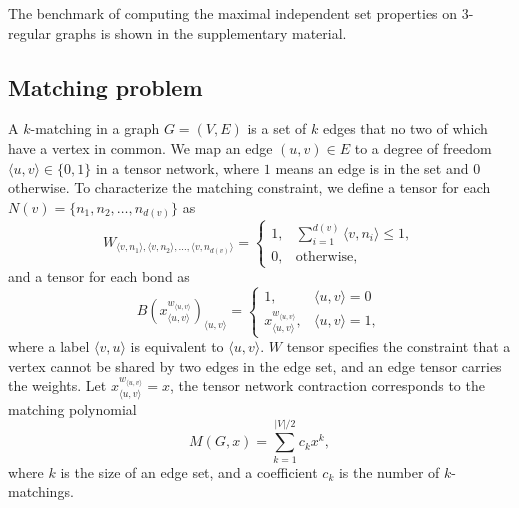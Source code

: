 \documentclass[onefignum, onetabnum]{siamart190516}
\newcommand{\<}{\langle}
\renewcommand{\>}{\rangle}
\begin{document}
The benchmark of computing the maximal independent set properties on $3$-regular graphs is shown in the supplementary material.

\subsection{Matching problem}
A $k$-matching in a graph $G=(V,E)$ is a set of $k$ edges that no two of which have a vertex in common.
We map an edge $(u, v) \in E$ to a degree of freedom $\langle u, v\rangle \in \{0, 1\}$ in a tensor network, where $1$ means an edge is in the set and $0$ otherwise.
To characterize the matching constraint, we define a tensor for each $N(v)=\{n_1, n_2,\ldots, n_{d(v)}\}$ as
\begin{equation}
    W_{\langle v, n_1\rangle, \langle v, n_2 \rangle, \ldots, \langle v, n_{d(v)}\rangle} = \begin{cases}
        1, & \sum_{i=1}^{d(v)} \langle v, n_i \rangle \leq 1,\\
        0, & \text{otherwise},
    \end{cases}
\end{equation}
and a tensor for each bond as
\begin{equation}
    B(x^{w_{\langle u,v \rangle}}_{\langle u,v\rangle})_{\langle u, v\rangle} = \begin{cases}
    1, & \langle u, v \rangle = 0 \\
    x^{w_{\langle u,v \rangle}}_{\langle u, v\rangle}, & \langle u, v \rangle = 1,
\end{cases}
\end{equation}
where a label $\langle v, u \rangle$ is equivalent to $\langle u,v\rangle$.
$W$ tensor specifies the constraint that a vertex cannot be shared by two edges in the edge set,
and an edge tensor carries the weights.
Let $x_{\langle u,v\rangle}^{w_{\langle u,v\rangle}}=x$, the tensor network contraction corresponds to the matching polynomial
\begin{equation}
    M(G, x) = \sum\limits_{k=1}^{|V|/2} c_k x^k,
\end{equation}
where $k$ is the size of an edge set, and a coefficient $c_k$ is the number of $k$-matchings.
\end{document}
